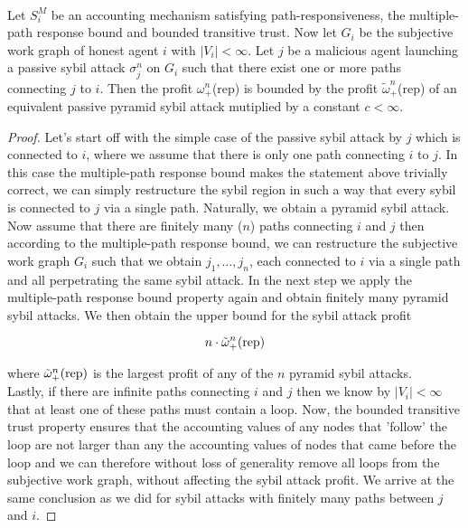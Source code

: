 \begin{lemma}[]\ \\
\label{lemma:Multiple-path Response Bound Lemma}
\noindent{}Let $S^M_i$ be an accounting mechanism satisfying path-responsiveness, the multiple-path response bound and bounded transitive trust. Now let $G_i$ be the subjective work graph of honest agent $i$ with $|V_i|<\infty$. Let $j$ be a malicious agent launching a passive sybil attack $\sigma_j^n$ on $G_i$ such that there exist one or more paths connecting $j$ to $i$. Then the profit $\omega_{+}^n$(rep) is bounded by the profit $\tilde{\omega}_{+}^n$(rep) of an equivalent passive pyramid sybil attack mutiplied by a constant $c<\infty$.
\end{lemma}
\begin{proof}
\noindent{}Let's start off with the simple case of the passive sybil attack by $j$ which is connected to $i$, where we assume that there is only one path connecting $i$ to $j$. In this case the multiple-path response bound makes the statement above trivially correct, we can simply restructure the sybil region in such a way that every sybil is connected to $j$ via a single path. Naturally, we obtain a pyramid sybil attack. \vspace{1em}\\

\noindent{}Now assume that there are finitely many ($n$) paths connecting $i$ and $j$ then according to the multiple-path response bound, we can restructure the subjective work graph $G_i$ such that we obtain $j_1,\ldots,j_n$, each connected to $i$ via a single path and all perpetrating the same sybil attack. In the next step we apply the multiple-path response bound property again and obtain finitely many pyramid sybil attacks. We then obtain the upper bound for the sybil attack profit

\[
n\cdot\tilde{\omega}_{+}^n({\rm rep})
\]

\noindent{}where $\tilde{\omega}_{+}^n({\rm rep})$ is the largest profit of any of the $n$ pyramid sybil attacks. \vspace{1em}\\

\noindent{}Lastly, if there are infinite paths connecting $i$ and $j$ then we know by $|V_i|<\infty$ that at least one of these paths must contain a loop. Now, the bounded transitive trust property ensures that the accounting values of any nodes that 'follow' the loop are not larger than any the accounting values of nodes that came before the loop and we can therefore without loss of generality remove all loops from the subjective work graph, without affecting the sybil attack profit. We arrive at the same conclusion as we did for sybil attacks with finitely many paths between $j$ and $i$.
\end{proof}


